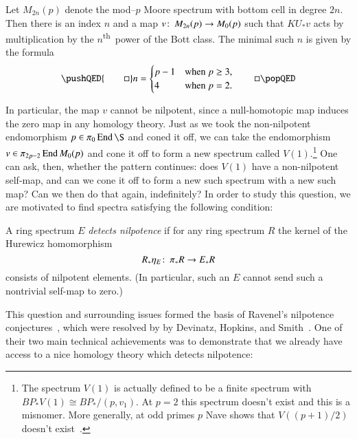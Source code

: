 \begin{theorem}\label{AdamsSelfMapThm}
Let $M_{2n}(p)$ denote the mod--$p$ Moore spectrum with bottom cell in degree $2n$.  Then there is an index $n$ and a map $v\colon\thinspace M_{2n}(p) \to M_0(p)$ such that $KU_* v$ acts by multiplication by the $n$\textsuperscript{th}\, power of the Bott class.  The minimal such $n$ is given by the formula
\[
\pushQED{\qed}
n = \begin{cases} p-1 & \text{when $p \ge 3$}, \\ 4 & \text{when $p = 2$}. \end{cases}
\qedhere
\popQED
\]
\end{theorem}

\noindent In particular, the map $v$ cannot be nilpotent, since a null-homotopic map induces the zero map in any homology theory.  Just as we took the non-nilpotent endomorphism $p \in \pi_0 \End \S$ and coned it off, we can take the endomorphism $v \in \pi_{2p-2} \operatorname{End} M_0(p)$ and cone it off to form a new spectrum called $V(1)$.\footnote{The spectrum $V(1)$ is actually defined to be a finite spectrum with $BP_* V(1) \cong BP_* / (p, v_1)$. At $p = 2$ this spectrum doesn't exist and this is a misnomer.  More generally, at odd primes $p$ Nave shows that $V((p+1)/2)$ doesn't exist~\cite[Theorem 1.3]{Nave}.}  One can ask, then, whether the pattern continues: does $V(1)$ have a non-nilpotent self-map, and can we cone it off to form a new such spectrum with a new such map?  Can we then do that again, indefinitely?  In order to study this question, we are motivated to find spectra satisfying the following condition:

\begin{definition}
A ring spectrum $E$ \textit{detects nilpotence} if for any ring spectrum $R$ the kernel of the Hurewicz homomorphism \[R_*\eta_E\colon\thinspace \pi_* R \to E_* R\] consists of nilpotent elements.  (In particular, such an $E$ cannot send such a nontrivial self-map to zero.)
\end{definition}

This question and surrounding issues formed the basis of Ravenel's nilpotence conjectures~\cite[Section 10]{RavenelLocalizationWRTPeriodic}, which were resolved by by Devinatz, Hopkins, and Smith~\cite{DHS,HopkinsSmith}.  One of their two main technical achievements was to demonstrate that we already have access to a nice homology theory which detects nilpotence:

